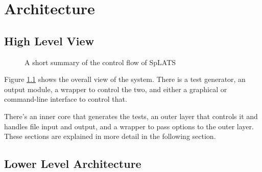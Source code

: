 \chapter{Architecture}

\section{High Level View}
\begin{center}
\begin{figure}
\caption{A short summary of the control flow of SpLATS}
\label{fig:Architecture_HighLevel}
\end{figure}
\end{center}

  Figure \ref{fig:Architecture_HighLevel} shows the overall view of the system. There is a test generator, an output module, a wrapper to control the two, and either a graphical or command-line interface to control that.

    There's an inner core that generates the tests, an outer layer that controls it and handles file input and output, and a wrapper to pass options to the outer layer. These sections are explained in more detail in the following section.
    
\section{Lower Level Architecture}

